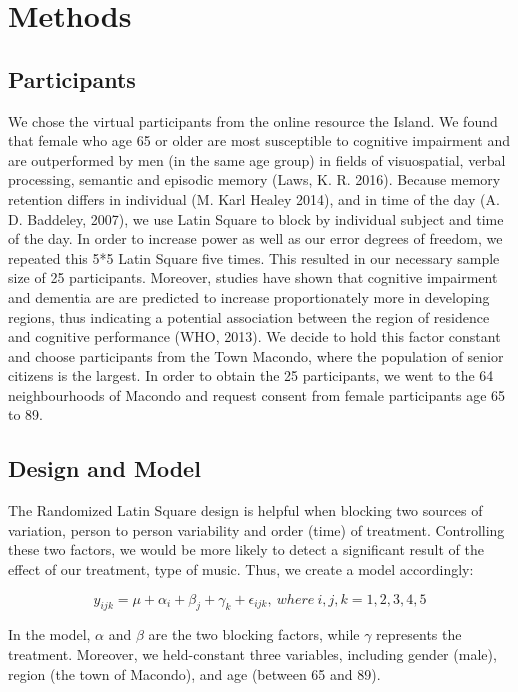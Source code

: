 \documentclass[]{article}
\begin{document}
\section{Methods}\label{methods}

\subsection{Participants}\label{participants}

We chose the virtual participants from the online resource the Island.
We found that female who age 65 or older are most susceptible to
cognitive impairment and are outperformed by men (in the same age group)
in fields of visuospatial, verbal processing, semantic and episodic
memory (Laws, K. R. 2016). Because memory retention differs in
individual (M. Karl Healey 2014), and in time of the day (A. D.
Baddeley, 2007), we use Latin Square to block by individual subject and
time of the day. In order to increase power as well as our error degrees
of freedom, we repeated this 5*5 Latin Square five times. This resulted
in our necessary sample size of 25 participants. Moreover, studies have
shown that cognitive impairment and dementia are are predicted to
increase proportionately more in developing regions, thus indicating a
potential association between the region of residence and cognitive
performance (WHO, 2013). We decide to hold this factor constant and
choose participants from the Town Macondo, where the population of
senior citizens is the largest. In order to obtain the 25 participants,
we went to the 64 neighbourhoods of Macondo and request consent from
female participants age 65 to 89.

\subsection{Design and Model}\label{design-and-model}

The Randomized Latin Square design is helpful when blocking two sources
of variation, person to person variability and order (time) of
treatment. Controlling these two factors, we would be more likely to
detect a significant result of the effect of our treatment, type of
music. Thus, we create a model accordingly:

\[y_{ijk} = \mu + \alpha_{i} + \beta_{j} + \gamma_{k} + \epsilon_{ijk},\ where\  i, j, k = 1, 2, 3, 4, 5\]

In the model, \(\alpha\) and \(\beta\) are the two blocking factors,
while \(\gamma\) represents the treatment. Moreover, we held-constant
three variables, including gender (male), region (the town of Macondo),
and age (between 65 and 89).
\end{document}

